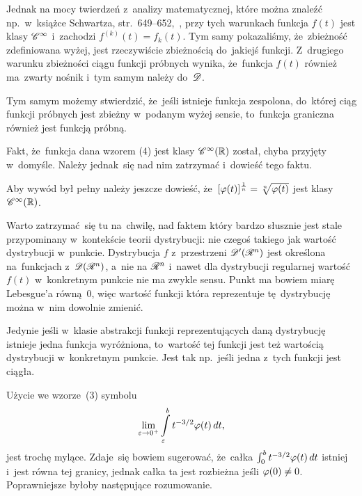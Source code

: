 \documentclass[a4paper,11pt]{article}
\begin{document}
Jednak na mocy twierdzeń z~analizy matematycznej, które można znaleźć
np.~w~książce Schwartza, str.~649--652,~\cite{Schwartz79}, przy tych
warunkach funkcja $f( t )$ jest klasy $\mathcal{C}^{ \infty }$ i~zachodzi
$f^{ ( k ) }( t ) = f_{ k }( t )$. Tym samy pokazaliśmy, że~zbieżność
zdefiniowana wyżej, jest rzeczywiście zbieżnością do~jakiejś funkcji.
Z~drugiego warunku zbieżności ciągu funkcji próbnych wynika,
że~funkcja $f( t )$ również ma~zwarty nośnik i~tym samym należy
do~$\mathcal{D}$.

Tym samym możemy stwierdzić, że~jeśli istnieje funkcja zespolona,
do~której ciąg funkcji próbnych jest zbieżny w~podanym wyżej sensie,
to~funkcja graniczna również jest funkcją próbną.

\vspace{\spaceFour}


\start {} Fakt, że~funkcja dana wzorem (4) jest klasy $\mathcal{C}^{ \infty }( \mathbb{R} )$
został, chyba przyjęty w~domyśle. Należy jednak~się nad nim zatrzymać
i~dowieść tego faktu. \Dok

\vspace{\spaceFour}


\start {} Aby wywód był pełny należy jeszcze dowieść,
że~$[ \varphi( t ) ]^{ \frac{ 1 }{ n } } = \sqrt[ n ]{ \varphi( t ) }$ jest
klasy $\mathcal{C}^{ \infty }( \mathbb{R} )$.

\vspace{\spaceFour}


\start {} Warto zatrzymać~się tu na~chwilę, nad faktem który
bardzo słusznie jest stale przypominany w~kontekście teorii
dystrybucji: nie czegoś takiego jak wartość dystrybucji w~punkcie.
Dystrybucja $f$ z~przestrzeni $\mathcal{D}'( \mathcal{R}^{ n } )$ jest określona
na~funkcjach z~$\mathcal{D}( \mathcal{R}^{ n } )$, a~nie na $\mathcal{R}^{ n }$ i~nawet dla dystrybucji
regularnej wartość $f( t )$ w~konkretnym punkcie nie ma zwykle sensu.
Punkt ma bowiem miarę Lebesgue'a równą~0, więc wartość funkcji która
reprezentuje tę~dystrybucję można w~nim dowolnie zmienić.

Jedynie jeśli w~klasie abstrakcji funkcji reprezentujących daną
dystrybucję istnieje jedna funkcja wyróżniona, to~wartość tej funkcji
jest też wartością dystrybucji w~konkretnym punkcie. Jest tak
np.~jeśli jedna z~tych funkcji jest ciągła.

\vspace{\spaceFour}


\start {} Użycie we wzorze~(3) symbolu
\begin{equation}
  \label{eq:Zem-s01-01}
  \lim\limits_{ \varepsilon \to 0^{ + } } \int\limits_{ \varepsilon }^{ b } t^{ -3/2 } \varphi( t ) \, dt,
\end{equation}
jest trochę mylące. Zdaje~się bowiem sugerować, że~całka
$\int_{ 0 }^{ b } t^{ -3/2 } \varphi( t ) \, dt$ istniej i~jest równa tej
granicy, jednak całka ta jest rozbieżna jeśli $\varphi( 0 ) \neq 0$.
Poprawniejsze byłoby następujące rozumowanie.
\end{document}
